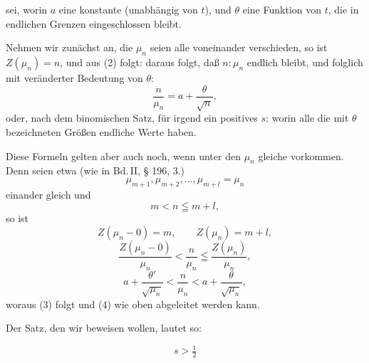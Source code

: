 sei, worin $a$ eine konstante (unabhängig von $t$), und $\theta$ eine Funktion von $t$, die in endlichen Grenzen eingeschlossen bleibt.

Nehmen wir zunächst an, die $\mu_n$ seien alle voneinander verschieden, so ist $Z(\mu_n) = n$, und aus (2) folgt:
daraus folgt, daß $n:\mu_n$ endlich bleibt, und folglich mit veränderter Bedeutung von $\theta$:
\[
\frac{n}{\mu_n} = a + \frac{\theta}{\sqrt{n}},
\]
oder, nach dem binomischen Satz, für irgend ein positives $s$:
worin alle die mit $\theta$ bezeichneten Größen endliche Werte haben.

Diese Formeln gelten aber auch noch, wenn unter den $\mu_n$ gleiche vorkommen. Denn seien etwa (wie in Bd.\,II, § 196, 3.)
\[
\mu_{m+1}, \mu_{m+2}, \ldots, \mu_{m+l} = \mu_n
\]
einander gleich und
\[
m < n \leqq m+l,
\]
so ist
\[
Z(\mu_n-0) = m, \qquad Z(\mu_n) = m+l,
\]
\[
\frac{Z(\mu_n-0)}{\mu_n} < \frac{n}{\mu_n} \leqq \frac{Z(\mu_n)}{\mu_n},
\]
\[
a + \frac{\theta'}{\sqrt{\mu_n}} < \frac{n}{\mu_n} < a + \frac{\theta}{\sqrt{\mu_n}},
\]
woraus (3) folgt und (4) wie oben abgeleitet werden kann.

Der Satz, den wir beweisen wollen, lautet so:


\[
s > \tfrac{1}{2}
\]
